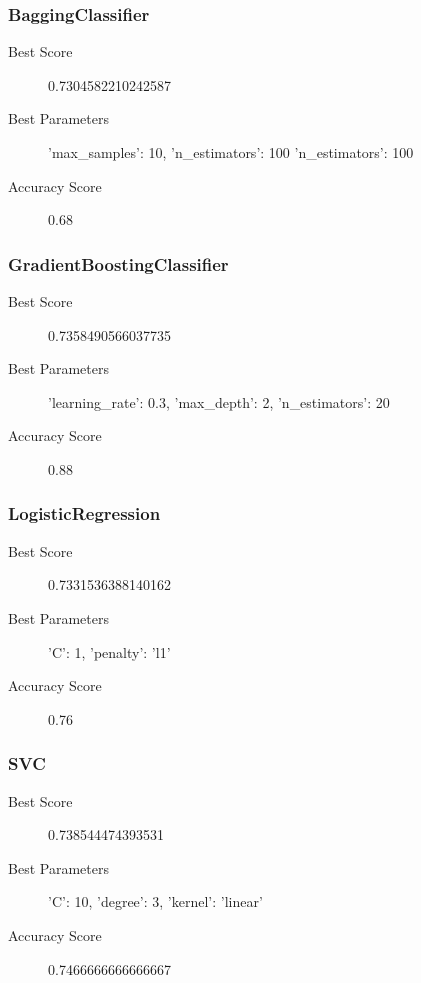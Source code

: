 \subsubsection{BaggingClassifier}

\begin{description}
	\item[Best Score] 0.7304582210242587
	\item[Best Parameters] 'max_samples': 10, 'n_estimators': 100 'n_estimators': 100
	\item[Accuracy Score] 0.68
\end{description}

\subsubsection{GradientBoostingClassifier}

\begin{description}
	\item[Best Score] 0.7358490566037735
	\item[Best Parameters] 'learning_rate': 0.3, 'max_depth': 2, 'n_estimators': 20
	\item[Accuracy Score] 0.88
\end{description}

\subsubsection{LogisticRegression}

\begin{description}
	\item[Best Score] 0.7331536388140162
	\item[Best Parameters] 'C': 1, 'penalty': 'l1'
	\item[Accuracy Score] 0.76
\end{description}

\subsubsection{SVC}

\begin{description}
	\item[Best Score] 0.738544474393531
	\item[Best Parameters] 'C': 10, 'degree': 3, 'kernel': 'linear'
	\item[Accuracy Score] 0.7466666666666667
\end{description}

